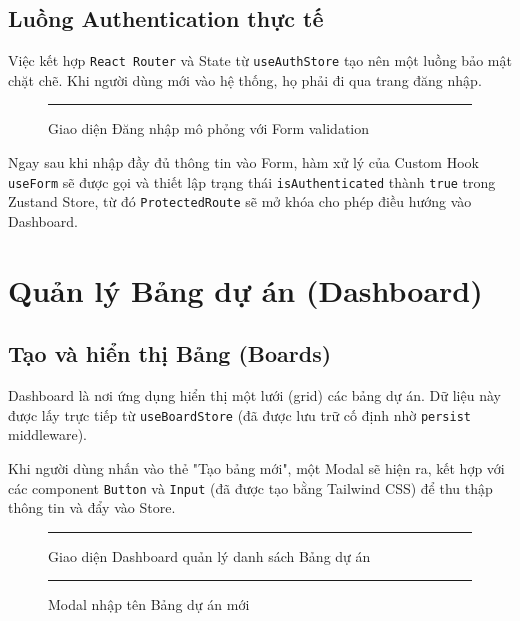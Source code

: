 \section{Luồng Authentication thực tế}
Việc kết hợp \texttt{React Router} và State từ \texttt{useAuthStore} tạo nên một luồng bảo mật chặt chẽ. Khi người dùng mới vào hệ thống, họ phải đi qua trang đăng nhập.

\begin{figure}[H]
    \centering
    \rule{0.8\textwidth}{0.5\textwidth}
    \caption{Giao diện Đăng nhập mô phỏng với Form validation}
\end{figure}

Ngay sau khi nhập đầy đủ thông tin vào Form, hàm xử lý của Custom Hook \texttt{useForm} sẽ được gọi và thiết lập trạng thái \texttt{isAuthenticated} thành \texttt{true} trong Zustand Store, từ đó \texttt{ProtectedRoute} sẽ mở khóa cho phép điều hướng vào Dashboard.

\chapter{Quản lý Bảng dự án (Dashboard)}

\section{Tạo và hiển thị Bảng (Boards)}
Dashboard là nơi ứng dụng hiển thị một lưới (grid) các bảng dự án. Dữ liệu này được lấy trực tiếp từ \texttt{useBoardStore} (đã được lưu trữ cố định nhờ \texttt{persist} middleware).

Khi người dùng nhấn vào thẻ "Tạo bảng mới", một Modal sẽ hiện ra, kết hợp với các component \texttt{Button} và \texttt{Input} (đã được tạo bằng Tailwind CSS) để thu thập thông tin và đẩy vào Store.

\begin{figure}[H]
    \centering
    \rule{0.9\textwidth}{0.6\textwidth}
    \caption{Giao diện Dashboard quản lý danh sách Bảng dự án}
\end{figure}

\begin{figure}[H]
    \centering
    \rule{0.6\textwidth}{0.4\textwidth}
    \caption{Modal nhập tên Bảng dự án mới}
\end{figure}

